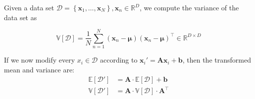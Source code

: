 
\begin{minipage}{0.48\textwidth}
	
	
	
	Given a data set $\mathcal{D}=\left\{\boldsymbol{x}_{1}, \ldots, \boldsymbol{x}_{N}\right\}, \boldsymbol{x}_{n} \in \mathbb{R}^{D}$, we compute the variance of the data set as
	
	\[
		\mathbb{V}[\mathcal{D}]=\frac{1}{N} \sum_{n=1}^{N}\left(\boldsymbol{x}_{n}-\boldsymbol{\mu}\right)\left(\boldsymbol{x}_{n}-\boldsymbol{\mu}\right)^{\top} \in \mathbb{R}^{D \times D}
	\]
	
	\divider
	
	If we now modify every $x_{i} \in \mathcal{D}$ according to $\boldsymbol{x}_i' = \boldsymbol{A}\boldsymbol{x}_i + \boldsymbol{b}$, then the transformed mean and variance are:
	\[
		\begin{aligned}
			\mathbb{E}[\mathcal{D'}] & = \boldsymbol{A} \cdot \mathbb{E}[\mathcal{D}] + \boldsymbol{b}            \\
			\mathbb{V}[\mathcal{D'}] & = \boldsymbol{A} \cdot \mathbb{V}[\mathcal{D}] \cdot \boldsymbol{A}^{\top} 
		\end{aligned}
	\]
	
	\vspace{0.5cm}
	
	
	

\end{minipage}
